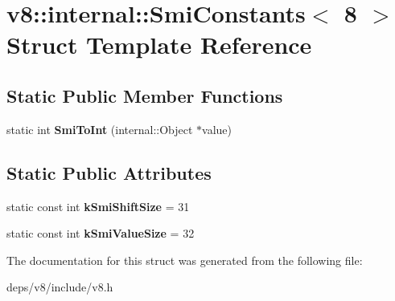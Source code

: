 \hypertarget{structv8_1_1internal_1_1_smi_constants_3_018_01_4}{}\section{v8\+:\+:internal\+:\+:Smi\+Constants$<$ 8 $>$ Struct Template Reference}
\label{structv8_1_1internal_1_1_smi_constants_3_018_01_4}
\subsection*{Static Public Member Functions}
\begin{DoxyCompactItemize}
\item 
\hypertarget{structv8_1_1internal_1_1_smi_constants_3_018_01_4_a39b02998985462ae1c8169e5c8ce7645}{}static int {\bfseries Smi\+To\+Int} (internal\+::\+Object $\ast$value)\label{structv8_1_1internal_1_1_smi_constants_3_018_01_4_a39b02998985462ae1c8169e5c8ce7645}

\end{DoxyCompactItemize}
\subsection*{Static Public Attributes}
\begin{DoxyCompactItemize}
\item 
\hypertarget{structv8_1_1internal_1_1_smi_constants_3_018_01_4_aac9343671e3b80204a817d9b2d77d6d4}{}static const int {\bfseries k\+Smi\+Shift\+Size} = 31\label{structv8_1_1internal_1_1_smi_constants_3_018_01_4_aac9343671e3b80204a817d9b2d77d6d4}

\item 
\hypertarget{structv8_1_1internal_1_1_smi_constants_3_018_01_4_ab039612e1c2ef7ea953f0fc0758cd16b}{}static const int {\bfseries k\+Smi\+Value\+Size} = 32\label{structv8_1_1internal_1_1_smi_constants_3_018_01_4_ab039612e1c2ef7ea953f0fc0758cd16b}

\end{DoxyCompactItemize}


The documentation for this struct was generated from the following file\+:\begin{DoxyCompactItemize}
\item 
deps/v8/include/v8.\+h\end{DoxyCompactItemize}
